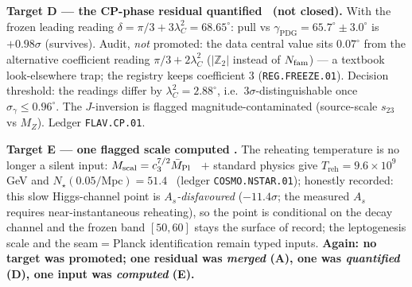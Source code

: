\begin{winbox}
\smallskip\noindent\textbf{Target D --- the CP-phase residual quantified \mE\ (not closed).} With the frozen leading
reading $\delta=\pi/3+3\lambda_C^2=68.65^\circ$: pull vs $\gamma_{\mathrm{PDG}}=65.7^\circ\pm3.0^\circ$ is $+0.98\sigma$
(survives). Audit, \emph{not} promoted: the data central value sits $0.07^\circ$ from the alternative coefficient
reading $\pi/3+2\lambda_C^2$ ($|\mathbb Z_2|$ instead of $N_{\mathrm{fam}}$) --- a textbook look-elsewhere trap; the registry keeps
coefficient $3$ (\texttt{REG.FREEZE.01}). Decision threshold: the readings differ by $\lambda_C^2=2.88^\circ$, i.e.\
$3\sigma$-distinguishable once $\sigma_\gamma\le0.96^\circ$. The $J$-inversion is flagged magnitude-contaminated
(source-scale $s_{23}$ vs $M_Z$). Ledger \texttt{FLAV.CP.01}.

\smallskip\noindent\textbf{Target E --- one flagged scale computed \mC.} The reheating temperature is no longer a
silent input: $M_{\mathrm{scal}}=c_3^{7/2}\bar M_{\mathrm{Pl}}$ \mE\ $+$ standard physics give
$T_{\mathrm{reh}}=9.6\times10^9$ GeV and $N_\star(0.05/\mathrm{Mpc})=51.4$ \mC\ (ledger \texttt{COSMO.NSTAR.01});
honestly recorded: this slow Higgs-channel point is \emph{$A_s$-disfavoured} ($-11.4\sigma$; the measured $A_s$
requires near-instantaneous reheating), so the point is conditional on the decay channel and the frozen band
$[50,60]$ stays the surface of record; the leptogenesis scale and the seam$=$Planck identification remain typed
inputs. \textbf{Again: no target was
promoted; one residual was \emph{merged} (A), one was \emph{quantified} (D), one input was \emph{computed} (E).}
\end{winbox}

